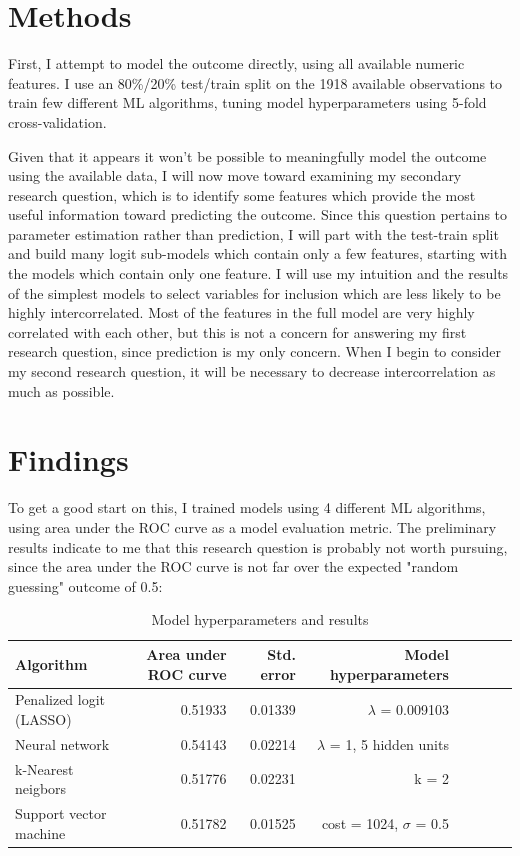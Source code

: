 \documentclass{article}
\begin{document}
	\section{Methods}
	
	First, I attempt to model the outcome directly, using all available numeric features. I use an 80\%/20\% test/train split on the 1918 available observations to train few different ML algorithms, tuning model hyperparameters using 5-fold cross-validation.
	
	Given that it appears it won't be possible to meaningfully model the outcome using the available data, I will now move toward examining my secondary research question, which is to identify some features which provide the most useful information toward predicting the outcome. Since this question pertains to parameter estimation rather than prediction, I will part with the test-train split and build many logit sub-models which contain only a few features, starting with the models which contain only one feature. I will use my intuition and the results of the simplest models to select variables for inclusion which are less likely to be highly intercorrelated. Most of the features in the full model are very highly correlated with each other, but this is not a concern for answering my first research question, since prediction is my only concern. When I begin to consider my second research question, it will be necessary to decrease intercorrelation as much as possible.
	
	\section{Findings}
	
	To get a good start on this, I trained models using 4 different ML algorithms, using area under the ROC curve as a model evaluation metric. The preliminary results indicate to me that this research question is probably not worth pursuing, since the area under the ROC curve is not far over the expected "random guessing" outcome of 0.5:
	
	\begin{table}[H]
		\centering
		\caption{Model hyperparameters and results\\}
			\begin{tabular}{l|r|r|r|r|r|r|r}
				\hline
				Algorithm & Area under ROC curve & Std. error & Model hyperparameters\\
				\hline
				Penalized logit (LASSO) & 0.51933 & 0.01339 & $\lambda$ = 0.009103\\
				\hline
				Neural network & 0.54143 & 0.02214 & $\lambda$ = 1, 5 hidden units\\
				\hline
				k-Nearest neigbors & 0.51776 & 0.02231 & k = 2\\
				\hline
				Support vector machine & 0.51782 & 0.01525 & cost = 1024, $\sigma$ = 0.5\\
				\hline
			\end{tabular}
	\end{table}
\end{document}
